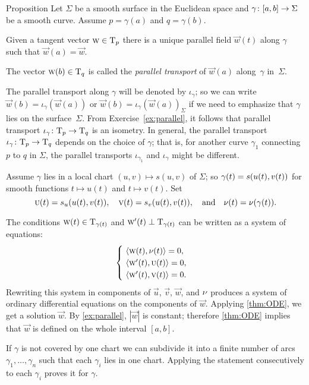 \begin{thm}{Proposition}\label{prop:parallel}
Let $\Sigma$ be a smooth surface in the Euclidean space and $\gamma\:[a,b]\z\to \Sigma$ be a smooth curve.
Assume $p=\gamma(a)$ and $q=\gamma(b)$.

Given a tangent vector ${\text{\sc{w}}}\in\mathrm{T}_p$ there is a unique parallel field ${\vec w}(t)$ along $\gamma$ such that ${\vec w}(a)={\vec w}$.
\end{thm}

The vector ${\text{\sc{w}}}(b)\in\mathrm{T}_q$ is called the \emph{parallel transport} of ${\vec w}(a)$ along~$\gamma$ in~$\Sigma$.

The parallel transport along $\gamma$ will be denoted by $\iota_\gamma$;
so we can write $\vec w(b)=\iota_\gamma({\vec w}(a))$ or $\vec w(b)=\iota_\gamma({\vec w}(a))_\Sigma$ if we need to emphasize that $\gamma$ lies on the surface~$\Sigma$.
From Exercise~\ref{ex:parallel}, it follows that parallel transport $\iota_\gamma\:\T_p\z\to\T_q$ is an isometry.
In general, the parallel transport $\iota_\gamma\:\T_p\z\to\T_q$ depends on the choice of $\gamma$; that is, for another curve $\gamma_1$ connecting $p$ to $q$ in $\Sigma$, the parallel transports $\iota_{\gamma_1}$ and $\iota_{\gamma}$ might be different.

Assume $\gamma$ lies in a local chart $(u,v)\mapsto s(u,v)$ of $\Sigma$;
so $\gamma(t)\z=s(u(t),v(t))$ for smooth functions $t\mapsto u(t)$ and $t\mapsto v(t)$.
Set 
\[
\text{\sc{u}}(t)=s_u(u(t),v(t)),
\quad
\text{\sc{v}}(t)=s_v(u(t),v(t)),
\quad
\text{and}
\quad
\nu(t)=\nu(\gamma(t)).
\]

The conditions $\text{\sc{w}}(t)\in \mathrm{T}_{\gamma(t)}$ and $\text{\sc{w}}'(t)\perp \mathrm{T}_{\gamma(t)}$ can be written as a system of equations:
\[
\begin{cases}
\ \langle\text{\sc{w}}(t), \nu(t)\rangle=0,
\\
\ \langle\text{\sc{w}}'(t), \text{\sc{u}}(t)\rangle=0,
\\
\ \langle\text{\sc{w}}'(t), \text{\sc{v}}(t)\rangle=0.
\end{cases}
\]
Rewriting this system in components of $\vec u$, $\vec v$, $\vec w$, and $\nu$ produces a system of ordinary differential equations on the components of $\vec w$.
Applying \ref{thm:ODE}, we get a solution $\vec w$.
By \ref{ex:parallel}, $|\vec w|$ is constant;
therefore \ref{thm:ODE} implies that $\vec w$ is defined on the whole interval $[a,b]$.

If $\gamma$ is not covered by one chart we can subdivide it into a finite number of arcs $\gamma_1,\dots,\gamma_n$ such that each $\gamma_i$ lies in one chart.
Applying the statement consecutively to each $\gamma_i$ proves it for $\gamma$.
\qeds

